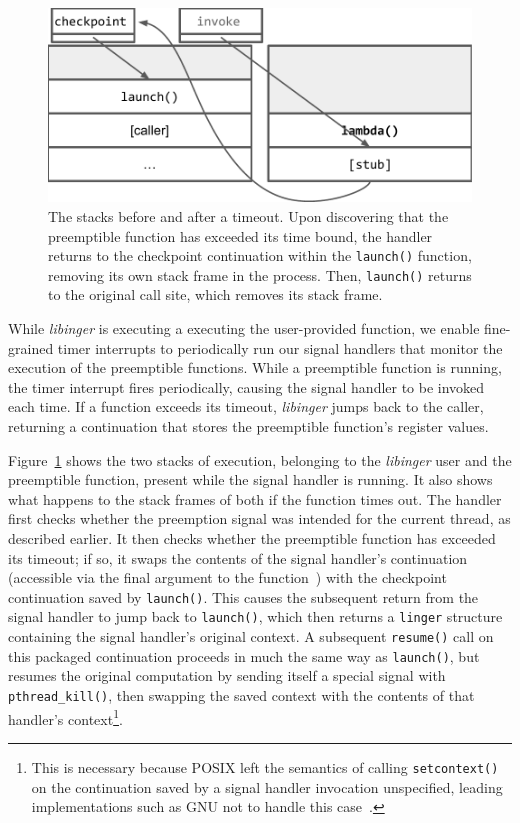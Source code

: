 \begin{figure}
\includegraphics[width=\columnwidth]{figs/twostacks}
\caption{The stacks before and after a timeout.  \textnormal{Upon discovering
that the preemptible function has exceeded its time bound, the handler returns to the
checkpoint continuation within the \texttt{launch()} function, removing its own stack
frame in the process.  Then, \texttt{launch()} returns to the original call site,
which removes its stack frame.}}
\label{fig:twostacks}
\end{figure}

While \textit{libinger} is executing a executing the user-provided function, we
enable fine-grained timer interrupts to periodically run our signal handlers
that monitor the execution of the preemptible functions. While a preemptible
function is running, the timer interrupt fires periodically, causing the signal
handler to be invoked each time. If a function exceeds its timeout, \textit{libinger}
jumps back to the caller, returning a continuation that stores the preemptible
function's register values.

Figure~\ref{fig:twostacks} shows the two stacks of execution, belonging to the
\textit{libinger} user and the preemptible function, present while the signal handler
is running. It also shows what happens to the stack frames of both if the
function times out. The handler first checks whether the preemption signal was
intended for the current thread, as described earlier.  It then checks whether
the preemptible function has exceeded its timeout; if so, it swaps the contents
of the signal handler's continuation (accessible via the final argument to the
function~\cite{sigaction-manpage}) with the checkpoint continuation saved by
\texttt{launch()}.  This causes the subsequent return from the signal handler
to jump back to \texttt{launch()}, which then returns a \texttt{linger}
structure containing the signal handler's original context.  A subsequent
\texttt{resume()} call on this packaged continuation proceeds in much the same
way as \texttt{launch()}, but resumes the original computation by sending
itself a special signal with \texttt{pthread\_kill()}, then swapping the saved
context with the contents of that handler's context\footnote{This is necessary
because POSIX left the semantics of calling \texttt{setcontext()} on the
continuation saved by a signal handler invocation unspecified, leading
implementations such as GNU not to handle this
case~\cite{getcontext-manpage}.}.

